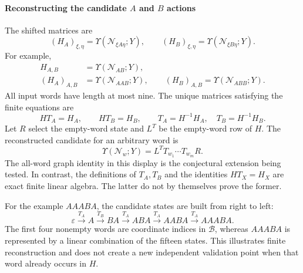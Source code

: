 \paragraph{Reconstructing the candidate $A$ and $B$ actions}
\label{supp:transfer_hankel_reconstruction}
The shifted matrices are
\begin{equation}
(H_A)_{\xi,\eta}=\Upsilon(\mathcal N_{\xi A\eta};Y),\qquad
(H_B)_{\xi,\eta}=\Upsilon(\mathcal N_{\xi B\eta};Y).
\label{supp:deriv:eq:hankel_matrices}
\end{equation}
For example,
\begin{equation}
\begin{aligned}
H_{A,B}&=\Upsilon(\mathcal N_{AB};Y),\\
(H_A)_{A,B}&=\Upsilon(\mathcal N_{AAB};Y),\qquad
(H_B)_{A,B}=\Upsilon(\mathcal N_{ABB};Y).
\end{aligned}
\label{supp:deriv:eq:hankel_examples}
\end{equation}
All input words have length at most nine. The unique matrices satisfying the finite equations are
\begin{equation}
HT_A=H_A,\qquad HT_B=H_B,
\qquad\boxed{T_A=H^{-1}H_A,\quad T_B=H^{-1}H_B.}
\label{supp:deriv:eq:TA_TB}
\end{equation}
Let $R$ select the empty-word state and $L^T$ be the empty-word row of $H$. The reconstructed candidate for an arbitrary word is
\begin{equation}
\boxed{\Upsilon(\mathcal N_w;Y)=L^TT_{w_1}\cdots T_{w_m}R.}
\label{supp:deriv:eq:raw_word_transfer}
\end{equation}
The all-word graph identity in this display is the conjectural extension being tested. In contrast, the definitions of $T_A,T_B$ and the identities $HT_X=H_X$ are exact finite linear algebra. The latter do not by themselves prove the former.

For the example $AAABA$, the candidate states are built from right to left:
\begin{equation}
\varepsilon\xrightarrow{T_A}A\xrightarrow{T_B}BA\xrightarrow{T_A}ABA\xrightarrow{T_A}AABA\xrightarrow{T_A}AAABA.
\label{supp:deriv:eq:AAABA_state_path}
\end{equation}
The first four nonempty words are coordinate indices in $\mathcal B$, whereas $AAABA$ is represented by a linear combination of the fifteen states. This illustrates finite reconstruction and does not create a new independent validation point when that word already occurs in $H$.

